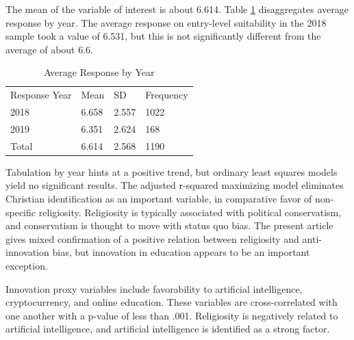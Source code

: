 \documentclass[AER]{./aea-latex-templates/AEA}
\begin{document}
        The mean of the variable of interest is about 6.614.
        Table \ref{tab:voi_by_is2018response} disaggregates average response by year.
        The average response on entry-level suitability in the 2018
        sample took a value of 6.531, but this is not significantly different
        from the average of about 6.6.
        
        \begin{table}
            \caption{Average Response by Year}
            \begin{tabular}{llll}
                Response Year & Mean & SD & Frequency \\
                2018 & 6.658 & 2.557 & 1022 \\
                2019 & 6.351 & 2.624 & 168 \\
                Total & 6.614 & 2.568 & 1190 %
            \end{tabular}
            \label{tab:voi_by_is2018response}
            \end{table}
        
        Tabulation by year hints at a positive trend,
        but ordinary least squares models yield no significant results.
        The adjusted r-squared maximizing model eliminates Christian identification as an important variable,
        in comparative favor of non-specific religiosity.
        Religiosity is typically associated with political conservatism, and conservatism is
        thought to move with status quo bias\cite{eidelman2012bias}. The present article gives mixed
        confirmation of a positive relation between religiosity and
        anti-innovation bias, but innovation in education appears to be an important exception.
        
        Innovation proxy variables include favorability to artificial
        intelligence, cryptocurrency, and online education. These variables are
        cross-correlated with one another with a p-value of less than .001.
        Religiosity is negatively related to artificial intelligence, and
        artificial intelligence is identified as a strong factor.
        
\end{document}

